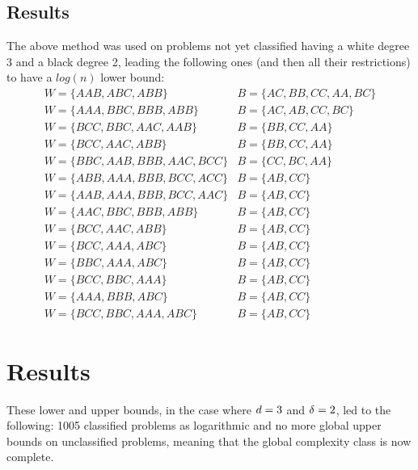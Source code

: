 \subsection{Results}
The above method was used on problems not yet classified having a white degree 3 and a black degree 2, leading the following ones (and then all their restrictions) to have a $log(n)$ lower bound:\\
$$\begin{array}{ll}
    W =\{AAB,ABC,ABB\} & B = \{AC, BB, CC, AA, BC\}\\
    W = \{AAA,BBC,BBB,ABB\} & B = \{AC, AB, CC, BC\}\\
    W = \{BCC,BBC,AAC,AAB\}& B = \{BB, CC, AA\}\\
    W = \{BCC,AAC,ABB\} & B = \{BB, CC, AA\}\\
    W = \{BBC,AAB,BBB,AAC,BCC\}& B = \{CC, BC, AA\}\\
    W = \{ABB,AAA,BBB,BCC,ACC\}& B = \{AB, CC\}\\
    W = \{AAB,AAA,BBB,BCC,AAC\}& B = \{AB, CC\}\\
    W = \{AAC,BBC,BBB,ABB\}& B = \{AB, CC\}\\
    W = \{BCC,AAC,ABB\}& B = \{AB, CC\}\\
    W = \{BCC,AAA,ABC\}& B = \{AB, CC\}\\
    W = \{BBC,AAA,ABC\}& B = \{AB, CC\}\\
    W = \{BCC,BBC,AAA\}& B = \{AB, CC\}\\
    W = \{AAA,BBB,ABC\}& B = \{AB, CC\}\\
    W = \{BCC,BBC,AAA,ABC\}& B = \{AB, CC\}
\end{array}$$

\section{Results}
These lower and upper bounds, in the case where $d = 3$ and $\delta = 2$, led to the following: 1005 classified problems as logarithmic and no more global upper bounds on unclassified problems, meaning that the global complexity class is now complete.